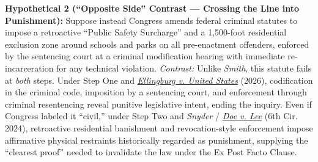 \documentclass[12pt]{article}
\begin{document}
\textbf{Hypothetical 2 (``Opposite Side'' Contrast --- Crossing the Line into Punishment):} Suppose instead Congress amends federal criminal statutes to impose a retroactive ``Public Safety Surcharge'' and a 1,500-foot residential exclusion zone around schools and parks on all pre-enactment offenders, enforced by the sentencing court at a criminal modification hearing with immediate re-incarceration for any technical violation. \textit{Contrast:} Unlike \textit{Smith}, this statute fails at \textit{both} steps. Under Step One and \href{https://www.law.cornell.edu/supremecourt/text/24-482}{\textit{Ellingburg v. United States}} (2026), codification in the criminal code, imposition by a sentencing court, and enforcement through criminal resentencing reveal punitive legislative intent, ending the inquiry. Even if Congress labeled it ``civil,'' under Step Two and \textit{Snyder} / \href{https://law.justia.com/cases/federal/appellate-courts/ca6/23-5248/23-5248-2024-05-15.html}{\textit{Doe v. Lee}} (6th Cir. 2024), retroactive residential banishment and revocation-style enforcement impose affirmative physical restraints historically regarded as punishment, supplying the ``clearest proof'' needed to invalidate the law under the Ex Post Facto Clause.
\end{document}
